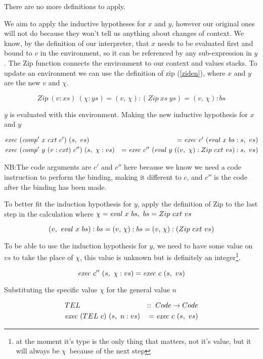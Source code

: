 \documentclass {article}
\begin{document}
There are no more definitions to apply.

We aim to apply the inductive 
hypotheses for $x$ and $y$,
however our original ones will 
not do because they won't tell us
anything about changes of context.
We know, by the definition of our interpreter,
that $x$ needs to be evaluated first and 
bound to $v$ in the environment, so it can be 
referenced by any sub-expression
in $y$.
The Zip function connects the environment
to our context and values stacks.
To update an environment
we can use the definition of zip (\ref{ziden}),
where $x$ and $y$ are the new $v$ and $\chi$.

\[ Zip\ (v:xs)\ (\chi:ys) 
	= (v,\, \chi):(Zip\ xs\ ys) = (v,\, \chi):bs \]

$y$ is evaluated with this environment.
Making the new inductive hypothesis for $x$ and $y$

\begin{eqnarray*}
	&\Exec (\Compp  x\ cxt\ c')\ (s,\ vs)
		&= \Exec c'\ (\evalf  x\ bs : s,\ vs)\\
	&\Exec (\Compp  y\ (v:cxt)\ c'')\ (s,\ \chi : vs) 
		&= \Exec c''\ (\evalf  y\ 
					(
					(v,\ \chi) : Zip\ cxt\ vs) : s,\ vs
					)\\
\end{eqnarray*}

NB:The code arguments are $c'$ and $c''$ 
here because we know we need a code instruction
to perform the binding, making it different to $c$,
and $c''$ is the code after the binding has been made.

To better fit the induction hypothesis for $y$,
apply the definition of Zip to the last step in the calculation
where \( \chi = \evalf  x\ bs,\ bs = Zip\ cxt\ vs \)

\[ (v,\ \mathit{eval\ }  x\ bs) :bs = (v,\, \chi):bs = (v,\, \chi):(Zip\ cxt\ vs) \]

To be able to use the induction hypothesis for $y$,
we need to have some value on $vs$ to take the place of $\chi$,
this value is unknown but is definitely an integer\footnote{
at the moment it's
type is the only thing that matters, not it's value,
but it will always be $\chi$\ because of the next step}.

\[ \Exec c''\ (s,\ \chi : vs) = \Exec c\ (s,\ vs) \]

Substituting the specific value $\chi$ for the general value $n$

\begin{eqnarray*}
&TEL\ &::\ Code \rightarrow Code \\
&\mathit{exec\ } (TEL\ c)\ (s,\ n:vs) &= \mathit{exec\ } c\ (s,\ vs)
\end{eqnarray*}
\end{document}
